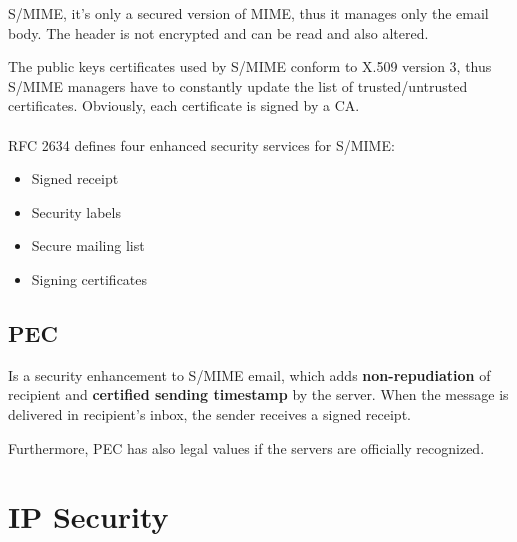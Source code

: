 \documentclass[oneside]{academica}
\begin{document}
\begin{note}
  S/MIME, it's only a secured version of MIME, thus it manages only the email body. The header is not encrypted and can be read and also altered.
\end{note}

\vspace{5pt}
The public keys certificates used by S/MIME conform to X.509 version 3, thus S/MIME managers have to constantly update the list of trusted/untrusted certificates.
Obviously, each certificate is signed by a CA.
\\\\
RFC 2634 defines four enhanced security services for S/MIME:
\begin{itemize}
  \item Signed receipt
  \item Security labels
  \item Secure mailing list
  \item Signing certificates
\end{itemize}

\section{PEC}

Is a security enhancement to S/MIME email, which adds \textbf{non-repudiation} of recipient and \textbf{certified sending timestamp} by the server.
When the message is delivered in recipient's inbox, the sender receives a signed receipt.

Furthermore, PEC has also legal values if the servers are officially recognized.

\chapter{IP Security}
\end{document}
